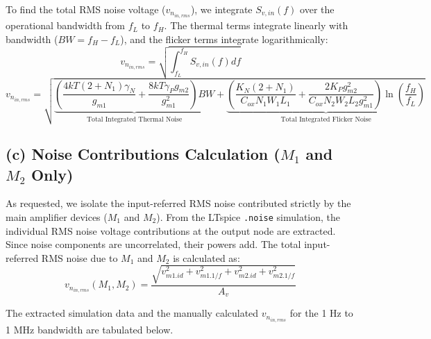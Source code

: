 \documentclass[12pt, a4paper]{article}
\begin{document}
To find the total RMS noise voltage ($v_{n_{in,rms}}$), we integrate $S_{v,in}(f)$ over the operational bandwidth from $f_L$ to $f_H$. The thermal terms integrate linearly with bandwidth ($BW = f_H - f_L$), and the flicker terms integrate logarithmically:
\begin{equation}
    v_{n_{in,rms}} = \sqrt{ \int_{f_L}^{f_H} S_{v,in}(f) df } 
\end{equation}
\begin{equation}
    v_{n_{in,rms}} = \sqrt{ \underbrace{ \left( \frac{4kT (2+N_1)\gamma_N}{g_{m1}} + \frac{8kT\gamma_P g_{m2}}{g_{m1}^2} \right) BW }_{\text{Total Integrated Thermal Noise}} + \underbrace{ \left( \frac{K_N (2+N_1)}{C_{ox} N_1 W_1 L_1} + \frac{2 K_P g_{m2}^2}{C_{ox} N_2 W_2 L_2 g_{m1}^2} \right) \ln\left(\frac{f_H}{f_L}\right) }_{\text{Total Integrated Flicker Noise}} }
\end{equation}

\subsection*{(c) Noise Contributions Calculation ($M_1$ and $M_2$ Only)}

As requested, we isolate the input-referred RMS noise contributed strictly by the main amplifier devices ($M_1$ and $M_2$). From the LTspice \texttt{.noise} simulation, the individual RMS noise voltage contributions at the output node are extracted. Since noise components are uncorrelated, their powers add. The total input-referred RMS noise due to $M_1$ and $M_2$ is calculated as:
\begin{equation}
    v_{n_{in,rms}}(M_1, M_2) = \frac{\sqrt{v_{m1.id}^2 + v_{m1.1/f}^2 + v_{m2.id}^2 + v_{m2.1/f}^2}}{A_v}
\end{equation}

The extracted simulation data and the manually calculated $v_{n_{in,rms}}$ for the 1 Hz to 1 MHz bandwidth are tabulated below.
\end{document}

